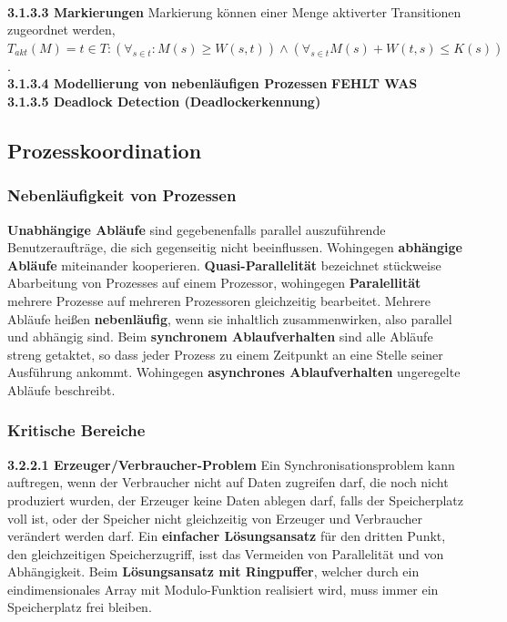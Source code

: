 \documentclass{article}
\begin{document}
    \\
    \textbf{3.1.3.3 Markierungen}\newline
    Markierung können einer Menge aktiverter Transitionen zugeordnet werden, $T_{akt}(M)={t\in T:(\forall_{s\in t}:M(s)\geq W(s,t))\wedge (\forall_{s\in t}M(s)+W(t,s)\leq K(s))}$.\newline
    \\
    \textbf{3.1.3.4 Modellierung von nebenläufigen Prozessen}\newline
    \textbf{FEHLT WAS}
    \\
    \textbf{3.1.3.5 Deadlock Detection (Deadlockerkennung)}\newline
\subsection{Prozesskoordination}
\subsubsection{Nebenläufigkeit von Prozessen}
    \textbf{Unabhängige Abläufe} sind gegebenenfalls parallel auszuführende Benutzeraufträge, die sich gegenseitig nicht beeinflussen. Wohingegen \textbf{abhängige Abläufe} miteinander kooperieren.\newline
    \textbf{Quasi-Parallelität} bezeichnet stückweise Abarbeitung von Prozesses auf einem Prozessor, wohingegen \textbf{Paralellität} mehrere Prozesse auf mehreren Prozessoren gleichzeitig bearbeitet.\newline
    Mehrere Abläufe heißen \textbf{nebenläufig}, wenn sie inhaltlich zusammenwirken, also parallel und abhängig sind.\newline
    Beim \textbf{synchronem Ablaufverhalten} sind alle Abläufe streng getaktet, so dass jeder Prozess zu einem Zeitpunkt an eine Stelle seiner Ausführung ankommt. Wohingegen \textbf{asynchrones Ablaufverhalten} ungeregelte Abläufe beschreibt.
\subsubsection{Kritische Bereiche}
    \textbf{3.2.2.1 Erzeuger/Verbraucher-Problem}\newline
    Ein Synchronisationsproblem kann auftregen, wenn der Verbraucher nicht auf Daten zugreifen darf, die noch nicht produziert wurden, der Erzeuger keine Daten ablegen darf, falls der Speicherplatz voll ist, oder der Speicher nicht gleichzeitig von Erzeuger und Verbraucher verändert werden darf.\newline
    Ein \textbf{einfacher Lösungsansatz} für den dritten Punkt, den gleichzeitigen Speicherzugriff, isst das Vermeiden von Parallelität und von Abhängigkeit.\newline
    Beim \textbf{Lösungsansatz mit Ringpuffer}, welcher durch ein eindimensionales Array mit Modulo-Funktion realisiert wird, muss immer ein Speicherplatz frei bleiben.
\end{document}

